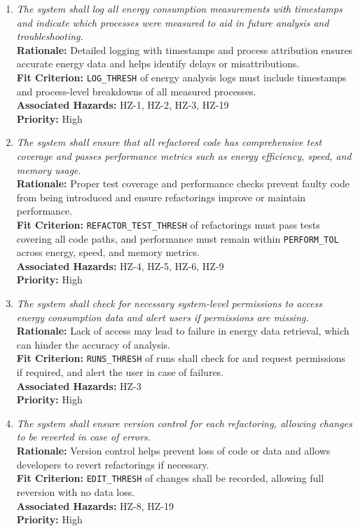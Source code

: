 \documentclass{article}
\begin{document}
\begin{enumerate}[label=SCR \arabic*., wide=0pt, leftmargin=*]

    \item \emph{The system shall log all energy consumption measurements with timestamps and indicate which processes were measured to aid in future analysis and troubleshooting.}\\
    {\bf Rationale:} Detailed logging with timestamps and process attribution ensures accurate energy data and helps identify delays or misattributions.\\
    {\bf Fit Criterion:} \texttt{LOG\_THRESH} of energy analysis logs must include timestamps and process-level breakdowns of all measured processes.\\
    {\bf Associated Hazards:} HZ-1, HZ-2, HZ-3, HZ-19\\
    {\bf Priority:} High

    \item \emph{The system shall ensure that all refactored code has comprehensive test coverage and passes performance metrics such as energy efficiency, speed, and memory usage.}\\
    {\bf Rationale:} Proper test coverage and performance checks prevent faulty code from being introduced and ensure refactorings improve or maintain performance.\\
    {\bf Fit Criterion:} \texttt{REFACTOR\_TEST\_THRESH} of refactorings must pass tests covering all code paths, and performance must remain within \texttt{PERFORM\_TOL} across energy, speed, and memory metrics.\\
    {\bf Associated Hazards:} HZ-4, HZ-5, HZ-6, HZ-9\\
    {\bf Priority:} High

    \item \emph{The system shall check for necessary system-level permissions to access energy consumption data and alert users if permissions are missing.}\\
    {\bf Rationale:} Lack of access may lead to failure in energy data retrieval, which can hinder the accuracy of analysis.\\
    {\bf Fit Criterion:} \texttt{RUNS\_THRESH} of runs shall check for and request permissions if required, and alert the user in case of failures.\\
    {\bf Associated Hazards:} HZ-3\\
    {\bf Priority:} High

    \item \emph{The system shall ensure version control for each refactoring, allowing changes to be reverted in case of errors.}\\
    {\bf Rationale:} Version control helps prevent loss of code or data and allows developers to revert refactorings if necessary.\\
    {\bf Fit Criterion:} \texttt{EDIT\_THRESH} of changes shall be recorded, allowing full reversion with no data loss.\\
    {\bf Associated Hazards:} HZ-8, HZ-19\\
    {\bf Priority:} High


\end{enumerate}
\end{document}

